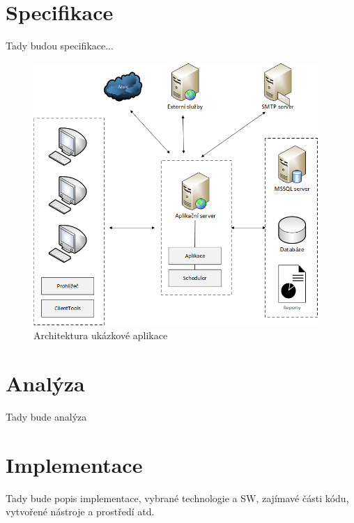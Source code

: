 \section{Specifikace}
Tady budou specifikace...

\begin{figure}[]
  \centering
  \includegraphics[height=10cm]{fig/app_architektura.png}
  \caption{Architektura ukázkové aplikace}
  \label{fig:architektura}
\end{figure}

\section{Analýza}
Tady bude analýza

\section{Implementace}
Tady bude popis implementace, vybrané technologie a SW, zajímavé části kódu, vytvořené nástroje a prostředí atd.

